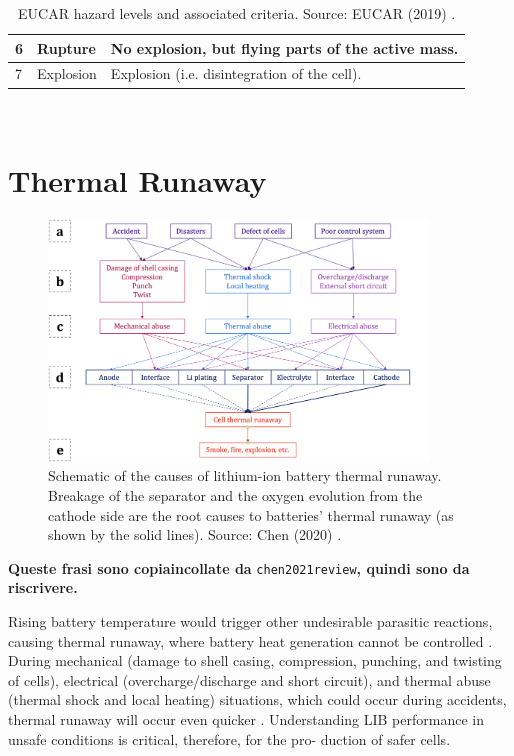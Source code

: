 \begin{table}[ht]
\begin{footnotesize}
\begin{tabular}{|p{13mm} p{28mm} p{102mm}|}
                \hline
                6 & Rupture & No explosion, but flying parts of the active mass.\T\B\\
                \hline
                7 & Explosion & Explosion (i.e. disintegration of the cell).\T\B\\
                \hline
                \end{tabular}
                \\[10pt]
                \caption[EUCAR hazard levels]{EUCAR hazard levels and associated criteria. Source: EUCAR (2019) \cite{eucar2019}.}
                \label{table:eucar}
        \end{footnotesize}
\end{table}

\section{Thermal Runaway}
\label{sec:thermal-runaway}

\begin{figure}[ht]
    \centering
    \includegraphics[width=0.9\textwidth]{Images/Chapter1/tr-graph.png}
    \caption[Schematic of the causes of lithium-ion battery thermal runaway]{Schematic of the causes of lithium-ion battery thermal runaway. Breakage of the separator and the oxygen evolution from the cathode side are the root causes to batteries' thermal runaway (as shown by the solid lines). Source: Chen (2020) \cite{chen2021review}.}
    \label{fig:tr-graph}
\end{figure}

\textbf{Queste frasi sono copiaincollate da} \texttt{chen2021review}\textbf{, quindi sono da riscrivere.}

Rising battery temperature would trigger other undesirable parasitic reactions, causing thermal runaway, where battery heat generation cannot be controlled \cite{wang2012thermal}.
During mechanical (damage to shell casing, compression, punching, and twisting of cells), electrical (overcharge/discharge and short circuit), and thermal abuse (thermal shock and local heating) situations, which could occur during accidents, thermal runaway will occur even quicker \cite{guo2010three,kim2007three,lamb2014evaluation}. Understanding LIB performance in unsafe conditions is critical, therefore, for the pro- duction of safer cells.

